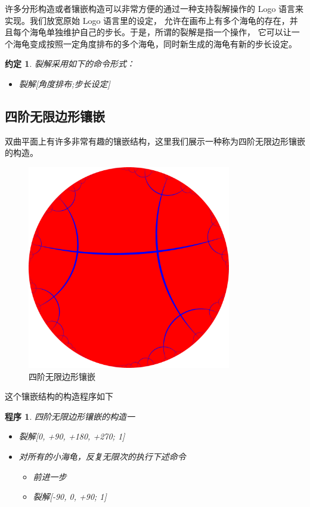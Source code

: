 \documentclass[a4paper,12pt]{article}
\newtheorem{program}{程序}
\newtheorem{convention}{约定}
\begin{document}
许多分形构造或者镶嵌构造可以非常方便的通过一种支持裂解操作的 Logo 语言来实现。我们放宽原始 Logo 语言里的设定，
允许在画布上有多个海龟的存在，并且每个海龟单独维护自己的步长。于是，所谓的裂解是指一个操作，
它可以让一个海龟变成按照一定角度排布的多个海龟，同时新生成的海龟有新的步长设定。

\begin{convention}
裂解采用如下的命令形式：
\begin{itemize}
\item 裂解[角度排布;步长设定]
\end{itemize}
\end{convention}

\subsection{四阶无限边形镶嵌}

双曲平面上有许多非常有趣的镶嵌结构，这里我们展示一种称为四阶无限边形镶嵌的构造。

\begin{figure}[ht]
\centering
\includegraphics[width=3.5in]{images/H2_tiling_24i-1.png}
\caption{四阶无限边形镶嵌}
\end{figure}

这个镶嵌结构的构造程序如下

\begin{program}
四阶无限边形镶嵌的构造一
\begin{itemize}
\item 裂解[0, +90, +180, +270; 1]
\item 对所有的小海龟，反复无限次的执行下述命令
\begin{itemize}\item 前进一步 \item 裂解[-90, 0, +90; 1] \end{itemize}
\end{itemize}
\end{program}
\end{document}
